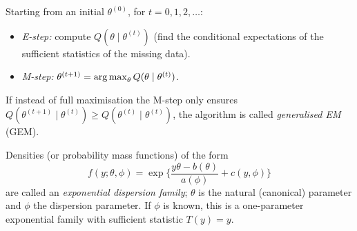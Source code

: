 \documentclass[main.tex]{subfiles}
\begin{document}
\begin{definition}\label{def:em-algoritma}
Starting from an initial $\theta^{(0)}$, for $t=0,1,2,\dots$:
\begin{itemize}
  \item \emph{E-step:} compute $Q(\theta\mid\theta^{(t)})$ (find the conditional expectations of the sufficient statistics of the missing data).
  \item \emph{M-step:} $\theta^{(t+1)}=\operatorname*{arg\,max}_\theta Q(\theta\mid\theta^{(t)})$.
\end{itemize}
If instead of full maximisation the M-step only ensures $Q(\theta^{(t+1)}\mid\theta^{(t)})\ge Q(\theta^{(t)}\mid\theta^{(t)})$, the algorithm is called \emph{generalised EM} (GEM).
\end{definition}

\begin{definition}\label{def:ustel-dagilim}
Densities (or probability mass functions) of the form
\[
f(y;\theta,\phi)=\exp\Big\{\frac{y\theta-b(\theta)}{a(\phi)}+c(y,\phi)\Big\}
\]
are called an \emph{exponential dispersion family}; $\theta$ is the natural (canonical) parameter and $\phi$ the dispersion parameter. If $\phi$ is known, this is a one-parameter exponential family with sufficient statistic $T(y)=y$.
\end{definition}
\end{document}
